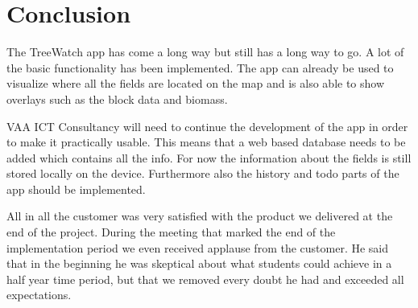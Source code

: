 \section{Conclusion}
The TreeWatch app has come a long way but still has a long way to go. A lot of the basic functionality has been implemented. The app can already be used to visualize where all the fields are located on the map and is also able to show overlays such as the block data and biomass.

VAA ICT Consultancy will need to continue the development of the app in order to make it practically usable. This means that a web based database needs to be added which contains all the info. For now the information about the fields is still stored locally on the device. Furthermore also the history and todo parts of the app should be implemented.

All in all the customer was very satisfied with the product we delivered at the end of the project. During the meeting that marked the end of the implementation period we even received applause from the customer. He said that in the beginning he was skeptical about what students could achieve in a half year time period, but that we removed every doubt he had and exceeded all expectations.